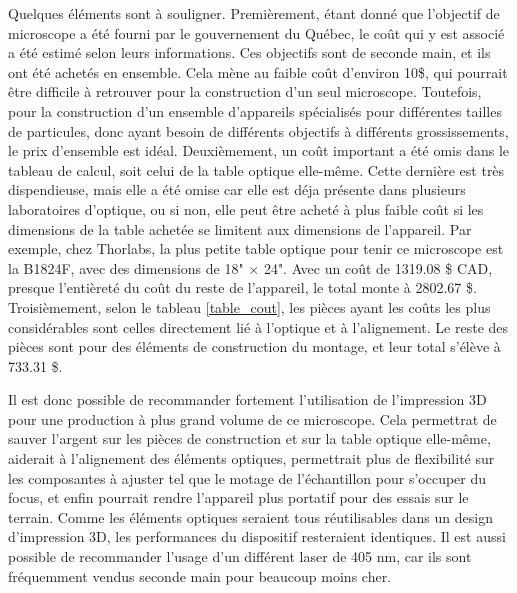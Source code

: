 \documentclass[11pt,letterpaper]{article}
\begin{document}
Quelques éléments sont à souligner. Premièrement, étant donné que l'objectif de microscope a
été fourni par le gouvernement du Québec, le coût qui y est associé a été estimé selon leurs
informations. Ces objectifs sont de seconde main, et ils ont été achetés en ensemble. Cela mène
au faible coût d'environ 10\$, qui pourrait être difficile à retrouver pour la construction d'un
seul microscope. Toutefois, pour la construction d'un ensemble d'appareils spécialisés pour
différentes tailles de particules, donc ayant besoin de différents objectifs à différents 
grossissements, le prix d'ensemble est idéal. Deuxièmement, un coût important a été omis dans 
le tableau de calcul, soit celui de la table optique elle-même. Cette dernière est très
dispendieuse, mais elle a été omise car elle est déja présente dans plusieurs laboratoires 
d'optique, ou si non, elle peut être acheté à plus faible coût si les dimensions de la table
achetée se limitent aux dimensions de l'appareil. Par exemple, chez Thorlabs, la plus petite 
table optique pour tenir ce microscope est la B1824F, avec des dimensions de 18" $\times$ 24".
Avec un coût de 1319.08 \$ CAD, presque l'entièreté du coût du reste de l'appareil, le total
monte à 2802.67 \$. Troisièmement, selon le tableau \ref{table_cout}, les pièces ayant les
coûts les plus considérables sont celles directement lié à l'optique et à l'alignement. Le
reste des pièces sont pour des éléments de construction du montage, et leur total s'élève à
733.31 \$.

Il est donc possible de recommander fortement l'utilisation de l'impression 3D pour une production
à plus grand volume de ce microscope. Cela permettrat de sauver l'argent sur les pièces de
construction et sur la table optique elle-même, aiderait à l'alignement des éléments optiques,
permettrait plus de flexibilité sur les composantes à ajuster tel que le motage de l'échantillon pour
s'occuper du focus, et enfin pourrait rendre l'appareil plus portatif pour des essais sur le terrain.
Comme les éléments optiques seraient tous réutilisables dans un design d'impression 3D, les
performances du dispositif resteraient identiques. Il est aussi possible de recommander l'usage
d'un différent laser de 405 nm, car ils sont fréquemment vendus seconde main pour beaucoup moins
cher.

% 
% 
\end{document}

